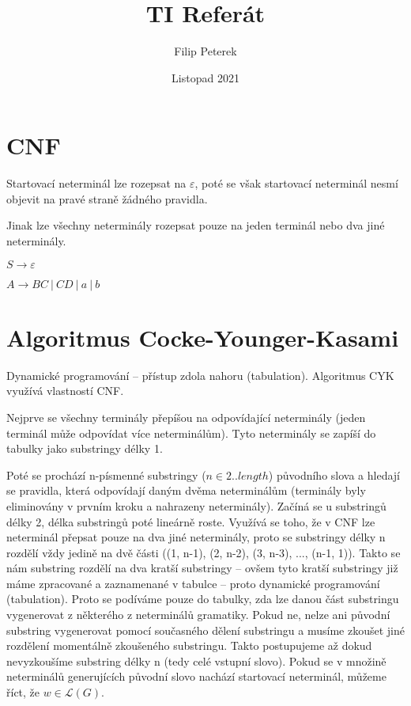 \documentclass{article}
\title{TI Referát}
\author{Filip Peterek}
\date{Listopad 2021}
\begin{document}
\maketitle

\section{CNF}

Startovací neterminál lze rozepsat na $\varepsilon$, poté
se však startovací neterminál nesmí objevit na pravé straně
žádného pravidla.

Jinak lze všechny neterminály rozepsat pouze na jeden
terminál nebo dva jiné neterminály.

$S \rightarrow \varepsilon$

$A \rightarrow BC \: | \: CD \: | \: a \: | \: b$

\section{Algoritmus Cocke-Younger-Kasami}

Dynamické programování -- přístup zdola nahoru (tabulation).
Algoritmus CYK využívá vlastností CNF. 

Nejprve se všechny terminály přepíšou na odpovídající
neterminály (jeden terminál může odpovídat více neterminálům).
Tyto neterminály se zapíší do tabulky jako substringy délky 1.

Poté se prochází n-písmenné substringy ($n \in 2..length$)
původního slova a hledají se pravidla, která odpovídají daným
dvěma neterminálům (terminály byly eliminovány v prvním kroku a
nahrazeny neterminály). Začíná se u substringů délky 2, délka
substringů poté lineárně roste. Využívá se toho, že v CNF
lze neterminál přepsat pouze na dva jiné neterminály,
proto se substringy délky n rozdělí vždy jedině na dvě části
((1, n-1), (2, n-2), (3, n-3), ..., (n-1, 1)). Takto se nám
substring rozdělí na dva kratší substringy -- ovšem tyto
kratší substringy již máme zpracované a zaznamenané v tabulce
-- proto dynamické programování (tabulation). Proto se podíváme
pouze do tabulky, zda lze danou část substringu vygenerovat z některého
z neterminálů gramatiky. Pokud ne, nelze ani původní substring
vygenerovat pomocí současného dělení substringu a musíme zkoušet
jiné rozdělení momentálně zkoušeného substringu. Takto postupujeme
až dokud nevyzkoušíme substring délky n (tedy celé vstupní slovo).
Pokud se v množině neterminálů generujících původní slovo nachází
startovací neterminál, můžeme říct, že $w \in 
\mathcal{L}(G)$.
\end{document}
